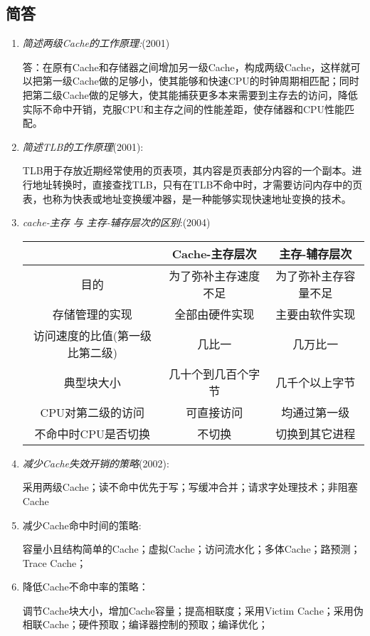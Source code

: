 \documentclass[a4paper]{ctexart}
\begin{document}
\subsection{简答}
\begin{enumerate}
  \item {\color{grey}\emph{简述两级Cache的工作原理:}(2001)
  
  答：在原有Cache和存储器之间增加另一级Cache，构成两级Cache，这样就可以把第一级Cache做的足够小，使其能够和快速CPU的时钟周期相匹配；同时把第二级Cache做的足够大，使其能捕获更多本来需要到主存去的访问，降低实际不命中开销，克服CPU和主存之间的性能差距，使存储器和CPU性能匹配。}

  \item {\color{grey}\emph{简述TLB的工作原理}(2001):
  
  TLB用于存放近期经常使用的页表项，其内容是页表部分内容的一个副本。进行地址转换时，直接查找TLB，只有在TLB不命中时，才需要访问内存中的页表，也称为快表或地址变换缓冲器，是一种能够实现快速地址变换的技术。}
  
  \item {\color{grey}\emph{cache-主存 与 主存-辅存层次的区别}:(2004)
  \begin{table}[!htbp]
    \centering
    \begin{tabular}{c|c|c}
      \hline
      &Cache-主存层次&主存-辅存层次 \\
      \hline  
      目的&为了弥补主存速度不足&为了弥补主存容量不足\\
      \hline
      存储管理的实现&全部由硬件实现&主要由软件实现\\
      \hline
      访问速度的比值(第一级比第二级)&几比一&几万比一\\
      \hline
      典型块大小&几十个到几百个字节&几千个以上字节\\
      \hline
      CPU对第二级的访问&可直接访问&均通过第一级\\
      \hline
      不命中时CPU是否切换&不切换&切换到其它进程\\
      \hline
    \end{tabular}  
  \end{table}}
  
        
  \item \emph{减少Cache失效开销的策略}(2002):

  采用两级Cache；读不命中优先于写；写缓冲合并；请求字处理技术；非阻塞Cache
  \item 减少Cache命中时间的策略:
  
  容量小且结构简单的Cache；虚拟Cache；访问流水化；多体Cache；路预测；Trace Cache；
  \item 降低Cache不命中率的策略：
  
  调节Cache块大小，增加Cache容量；提高相联度；采用Victim Cache；采用伪相联Cache；硬件预取；编译器控制的预取；编译优化；
\end{enumerate}
\end{document}

